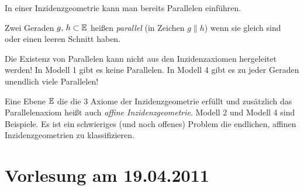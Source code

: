 In einer Inzidenzgeometrie kann man bereits Parallelen einführen.

\begin{defi}[Parallelität]
    Zwei Geraden $g,\,h \subset \mathbb E$ heißen {\em parallel} (in Zeichen $g\|h$) wenn sie gleich sind
    oder einen leeren Schnitt haben.
\end{defi}

Die Existenz von Parallelen kann nicht aus den Inzidenzaxiomen hergeleitet werden! In Modell 1 gibt
es keine Parallelen. In Modell 4 gibt es zu jeder Geraden unendlich viele Parallelen!



Eine Ebene $\mathbb E$ die die 3 Axiome der Inzidenzgeometrie erfüllt und zusätzlich das Parallelenaxiom
heißt auch {\em affine Inzidenzgeometrie}. Modell 2 und Modell 4 sind Beispiele. Es ist ein
schwieriges (und noch offenes) Problem die endlichen, affinen Inzidenzgeometrien zu klassifizieren.


%
%

\section*{Vorlesung am 19.04.2011}

